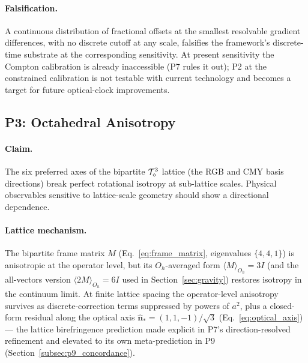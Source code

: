 \paragraph{Falsification.}
A continuous distribution of fractional offsets at the smallest
resolvable gradient differences, with no discrete cutoff at any
scale, falsifies the framework's discrete-time substrate at the
corresponding sensitivity. At present sensitivity the Compton
calibration is already inaccessible (P7 rules it out); P2 at the
constrained calibration is not testable with current technology and
becomes a target for future optical-clock improvements.

\subsection{P3: Octahedral Anisotropy}
\label{subsec:p3_anisotropy}

\paragraph{Claim.}
The six preferred axes of the bipartite $\mathcal{T}_\diamond^3$ lattice (the
RGB and CMY basis directions) break perfect rotational isotropy at
sub-lattice scales. Physical observables sensitive to lattice-scale
geometry should show a directional dependence.

\paragraph{Lattice mechanism.}
The bipartite frame matrix $M$ (Eq.~\ref{eq:frame_matrix},
eigenvalues $\{4, 4, 1\}$) is anisotropic at the operator level, but
its $O_h$-averaged form $\langle M \rangle_{O_h} = 3I$ (and the
all-vectors version $\langle 2M \rangle_{O_h} = 6I$ used in
Section~\ref{sec:gravity}) restores isotropy in the continuum limit.
At finite lattice spacing the operator-level anisotropy survives as
discrete-correction terms suppressed by powers of $a^2$, plus a
closed-form residual along the optical axis
$\hat{\mathbf{n}}_* = (1, 1, -1)/\sqrt{3}$
(Eq.~\ref{eq:optical_axis}) --- the lattice birefringence prediction
made explicit in P7's direction-resolved refinement and elevated to
its own meta-prediction in P9
(Section~\ref{subsec:p9_concordance}).

